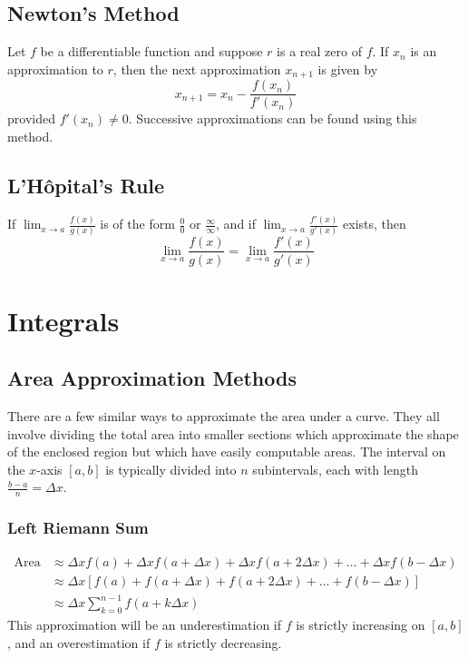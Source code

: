 \documentclass{artikel3}
\begin{document}
\subsection{Newton's Method}
Let $f$ be a differentiable function and suppose $r$ is a real zero of $f$.
If $x_n$ is an approximation to $r$, then the next approximation $x_{n+1}$ 
is given by
\[ x_{n+1}=x_n-\frac{f(x_n)}{f'(x_n)} \]
provided $f'(x_n)\neq 0$. Successive approximations can be found using this method.

\subsection{L'H\^{o}pital's Rule}
If $\displaystyle\lim_{x \to a}\frac{f(x)}{g(x)}$ is of the form $\frac{0}{0}$ 
or $\frac{\infty}{\infty}$, and if 
$\displaystyle\lim_{x \to a}\frac{f'(x)}{g'(x)}$ exists, then 
\[ \lim_{x \to a}\frac{f(x)}{g(x)}=\lim_{x \to a}\frac{f'(x)}{g'(x)} \]

\section{Integrals}

\subsection{Area Approximation Methods}
There are a few similar ways to approximate the area under a curve.
They all involve dividing the total area into smaller sections which approximate 
the shape of the enclosed region but which have easily computable areas.
The interval on the $x$-axis $[a,b]$ is typically divided into $n$ subintervals, 
each with length $\frac{b-a}{n}=\Delta x$.

\subsubsection{Left Riemann Sum}
\begin{align*}
\mathrm{Area} &\approx \Delta xf(a)+\Delta xf(a+\Delta x)+\Delta xf(a+2\Delta x)
+\ldots+\Delta xf(b-\Delta x)\\
    &\approx \Delta x[f(a)+f(a+\Delta x)+f(a+2\Delta x)+\ldots+f(b-\Delta x)]\\
    &\approx \Delta x \sum_{k=0}^{n-1} f(a+k\Delta x)
\end{align*}
This approximation will be an underestimation if $f$ is strictly increasing 
on $[a, b]$, and an overestimation if $f$ is strictly decreasing.
\end{document}
